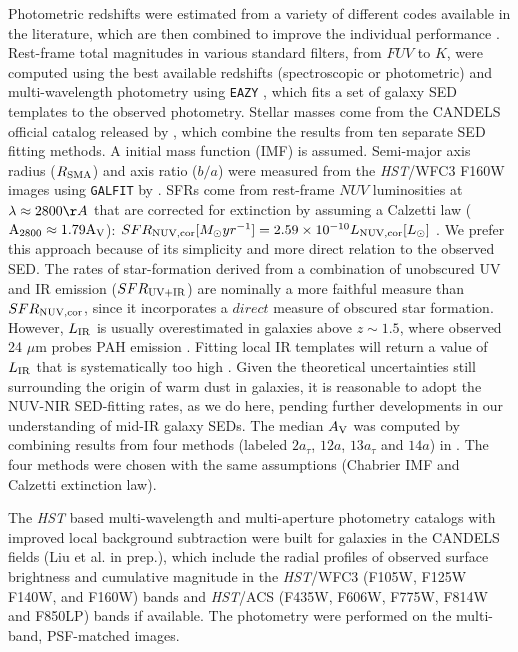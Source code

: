 \documentclass[twocolumn]{aastex61}
\begin{document}
Photometric redshifts were estimated from a variety of different codes available
in the literature,
which are then combined to improve the individual performance
\citep[][]{Dahlen13}.
%
Rest-frame total magnitudes in various standard filters, from $FUV$ to $K$,
were computed using the best available redshifts (spectroscopic or photometric) and multi-wavelength
photometry using {\tt EAZY} \citep[][]{Brammer+08}, which fits a set of galaxy SED 
templates to the observed photometry.
%
Stellar masses come from the CANDELS official catalog released by
\citet[][]{Santini+15}, which combine the results from ten separate SED fitting methods.
A \citet[][]{Chabrier03} initial mass function (IMF) is assumed.
%
Semi-major axis radius ($R_{\rm SMA}$) and axis ratio ($b/a$) were measured 
from the {\it HST}/WFC3 F160W images using {\tt GALFIT} \citep[][]{Peng+02} 
by \citet[][]{vdWel+12}. 
%
SFRs come from rest-frame $NUV$ luminosities at $\lambda\approx2800\AA$ 
that are corrected for extinction by assuming a Calzetti law ($\rm A_{2800}\approx1.79A_V$):
$ SFR_{\rm NUV,cor}[M_{\odot}{yr}^{-1}]=2.59\times10^{-10}L_{\rm NUV,cor}[L_{\odot}]$ 
\citep[][]{Kennicutt12}. 
%
We prefer this approach because of its simplicity and more direct relation to
the observed SED. The rates of star-formation derived from a combination of unobscured UV 
and IR emission ($SFR_{\rm UV+IR}$) are nominally a more faithful measure than $SFR_{\rm NUV,cor}$, 
since it incorporates a $direct$ measure of obscured star formation. However, 
$L_{\rm IR}$ is usually overestimated in galaxies above $z\sim1.5$, 
where observed 24 $\mu$m probes PAH emission \citep[][]{Tielens08}. 
Fitting local IR templates will return a value of $L_{\rm IR}$ that is systematically 
too high \citep[][]{Salim09}. Given the theoretical uncertainties still surrounding 
the origin of warm dust in galaxies, it is reasonable to adopt the NUV-NIR SED-fitting rates, 
as we do here, pending further developments in our understanding of mid-IR galaxy SEDs. 
The median $A_{\rm V}$ was computed by combining results from four methods (labeled 
$2a_{\tau}$, $12a$, $13a_{\tau}$ and $14a$) in \citet[][]{Santini+15}. 
The four methods were chosen with the same assumptions (Chabrier IMF and Calzetti extinction law). 

The {\it HST} based multi-wavelength and multi-aperture photometry catalogs 
with improved local background subtraction were built for galaxies in the CANDELS fields 
(Liu et al. in prep.), which include the radial profiles of 
observed surface brightness and cumulative magnitude 
in the {\it HST}/WFC3 (F105W, F125W F140W, and F160W) bands and {\it HST}/ACS 
(F435W, F606W, F775W, F814W and F850LP) bands if available. 
The photometry were performed on the multi-band, PSF-matched images. 
\end{document}
